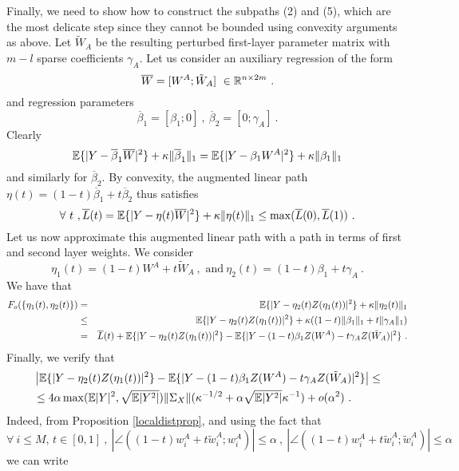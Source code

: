 Finally, we need to show how to construct the subpaths (2) and (5), which are the most delicate step since they cannot be bounded using
convexity arguments as above. 
Let $\tilde{W}_A$ be the resulting perturbed first-layer parameter matrix 
with $m-l$ sparse coefficients $\gamma_A$.
Let us consider an auxiliary regression of the form 
$$\overline{W} = [ W^A ; \tilde{W}_A] ~\in {\mathbb{R}}^{n \times 2m}~.$$
and regression parameters 
$$\overline{\beta}_1 = [ \beta_1; 0]~,~\overline{\beta}_2 = [0; \gamma_A]~.$$
Clearly 
$${\mathbb{E}}\{ | Y - \overline{\beta}_1 \overline{W} |^2 \} + \kappa \| \overline{\beta}_1 \|_1 = {\mathbb{E}}\{ | Y - \beta_1 W^A |^2 \} + \kappa \| {\beta}_1 \|_1 $$ 
 and similarly for $\overline{\beta}_2$. By convexity, the augmented linear path $\eta(t) =(1- t) \overline{\beta}_1 + t \overline{\beta}_2$ thus satisfies 
$$\forall~t~,\overline{L}(t) = {\mathbb{E}}\{ | Y - \eta(t) \overline{W} |^2 \} + \kappa \| \eta(t) \|_1 \leq \max(\overline{L}(0), \overline{L}(1))~. $$
Let us now approximate this augmented linear path with a path in terms of first and second layer weights. 
We consider
$$\eta_1(t) = (1-t) W^A + t \tilde{W}_A~,\text{ and}~\eta_2(t) = (1- t) {\beta}_1 + t \gamma_A~.$$
We have that 
\begin{eqnarray}
\label{bub1}
F_{o}(\{ \eta_1(t), \eta_2(t) \}) &=& {\mathbb{E}} \{ | Y - \eta_2(t) Z(\eta_1(t) ) |^2 \} + \kappa \| \eta_2(t) \|_1  \\ 
&\leq & {\mathbb{E}} \{ | Y - \eta_2(t) Z(\eta_1(t) ) |^2 \} + \kappa(  ( 1-t) \| {\beta}_1\|_1 + t \| \gamma_A \|_1 ) \nonumber \\
& = & \overline{L}(t) + {\mathbb{E}} \{ | Y - \eta_2(t) Z(\eta_1(t) ) |^2 \}  - {\mathbb{E}} \{ | Y - (1-t) \beta_1 Z(W^A) - t \gamma_A Z(\tilde{W}_A) |^2 \} ~.  \nonumber
\end{eqnarray}
Finally, we verify that
{\small 
\begin{eqnarray}
\label{bub2}
& \left | {\mathbb{E}} \{ | Y - \eta_2(t) Z(\eta_1(t) ) |^2 \}  - {\mathbb{E}} \{ | Y - (1-t) \beta_1 Z(W^A) - t \gamma_A Z(\tilde{W}_A) |^2 \} \right|  \leq\\
& \leq 4  \alpha \max({\mathbb{E}} |Y|^2, \sqrt{{\mathbb{E}}|Y^2|}) \| \Sigma_X \| ( \kappa^{-1/2} + \alpha \sqrt{{\mathbb{E}}|Y^2|} \kappa^{-1}) + o(\alpha^2)~. \nonumber
\end{eqnarray}}
Indeed, from Proposition \ref{localdistprop}, and using the fact that 
$$\forall~i\leq M,\, t \in [0,1]~,~\left| \angle( (1-t)w^A_i + t \tilde{w}^A_i ; w^A_i) \right| \leq \alpha~,~ \left| \angle( (1-t)w^A_i + t \tilde{w}^A_i ; \tilde{w}^A_i) \right| \leq \alpha $$
we can write 
